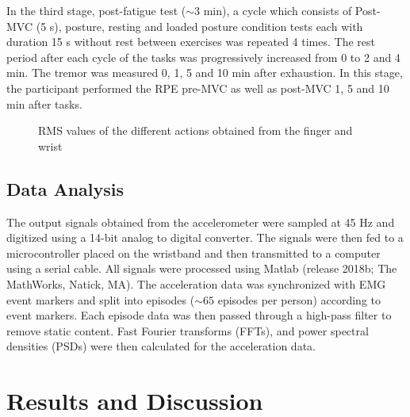 \documentclass[conference, a4paper]{IEEEtran}
\begin{document}
In the third stage, post-fatigue test ($\sim 3$ min), a cycle which consists of Post-MVC (5 s), posture, resting and loaded posture condition tests each with duration 15 s without rest between exercises was repeated 4 times. The rest period after each cycle of the tasks was progressively increased from 0 to 2 and 4 min. The tremor was measured 0, 1, 5 and 10 min after exhaustion. In this stage, the participant performed the RPE pre-MVC as well as post-MVC 1, 5 and 10 min after tasks.
%
\begin{figure}[ht!]
	\centering
	\label{fig:finger_PC}
	\hfill
	\label{fig:finger_RC}
	\hfill
	\label{fig:finger_LPC}
	\medskip
  \label{fig:wrist_PC}
  \hfill
  \label{fig:wrist_RC}
  \hfill
  \label{fig:wrist_LPC}
	\caption{RMS values of the different actions obtained from the finger and wrist}
	\label{fig:RMS}
\end{figure}

%
\subsection{Data Analysis}
%
The output signals obtained from the accelerometer were sampled at 45 Hz and digitized using a 14-bit analog to digital converter. The signals were then fed to a microcontroller placed on the wristband and then transmitted to a computer using a serial cable. All signals were processed using Matlab (release 2018b; The MathWorks, Natick, MA). The acceleration data was synchronized with EMG event markers and split into episodes ($\sim 65$ episodes per person) according to event markers. Each episode data was then passed through a high-pass filter to remove static content. Fast Fourier transforms (FFTs), and power spectral densities (PSDs) were then calculated for the acceleration data.
%
\section{Results and Discussion}
%
\end{document}
